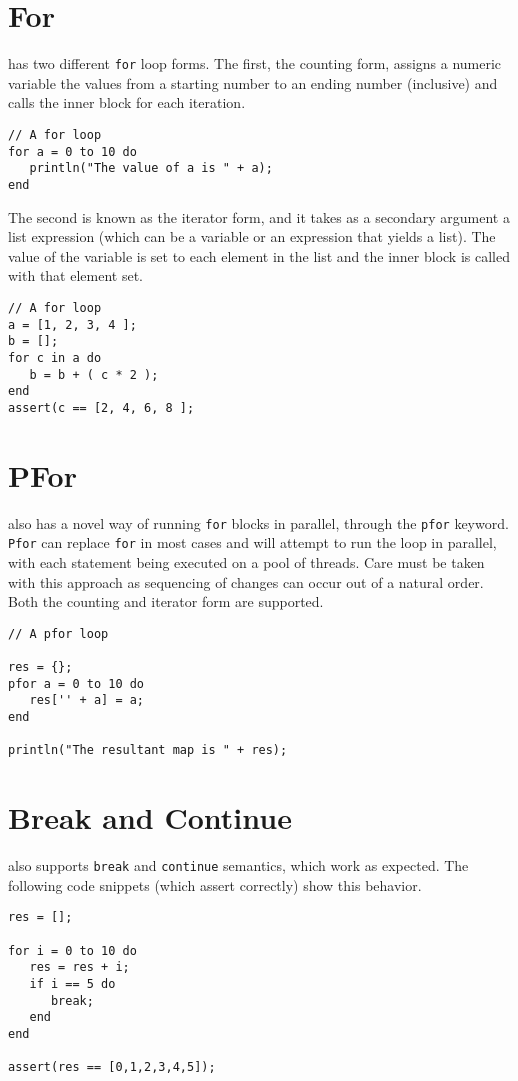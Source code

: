 \section{For}
\Reflex has two different \Verb+for+ loop forms. The first, the counting form, assigns a numeric variable the values from a starting number to an ending number (inclusive) and calls the inner block for each iteration.
\begin{lstlisting}[caption={For counting form}]
// A for loop
for a = 0 to 10 do
   println("The value of a is " + a);
end
\end{lstlisting}
The second is known as the iterator  form, and it takes as a secondary argument a list expression (which can be a variable or an expression that yields a list). The value of the variable is set to each element in the list and the inner block is called with that element set.
\begin{lstlisting}[caption={For iterator form}]
// A for loop
a = [1, 2, 3, 4 ];
b = [];
for c in a do
   b = b + ( c * 2 );
end
assert(c == [2, 4, 6, 8 ];
\end{lstlisting}
\section{PFor}
\Reflex also has a novel way of running \Verb+for+ blocks in parallel, through the \verb+pfor+ keyword. \verb+Pfor+ can replace \verb+for+ in most cases and \Reflex will attempt to run the loop in parallel, with each statement being executed on a pool of threads. Care must be taken with this approach as sequencing of changes can occur out of a natural order. Both the counting and iterator form are supported.
\begin{lstlisting}[caption={PFor counting form}]
// A pfor loop

res = {};
pfor a = 0 to 10 do
   res['' + a] = a;
end

println("The resultant map is " + res);
\end{lstlisting}

\section{Break and Continue}
\Reflex also supports \Verb+break+ and \verb+continue+ semantics, which work as expected. The following code snippets (which assert correctly) show this behavior.
\begin{lstlisting}[caption={Break in for loop}]
res = [];

for i = 0 to 10 do
   res = res + i;
   if i == 5 do
      break;
   end
end

assert(res == [0,1,2,3,4,5]);
\end{lstlisting}

